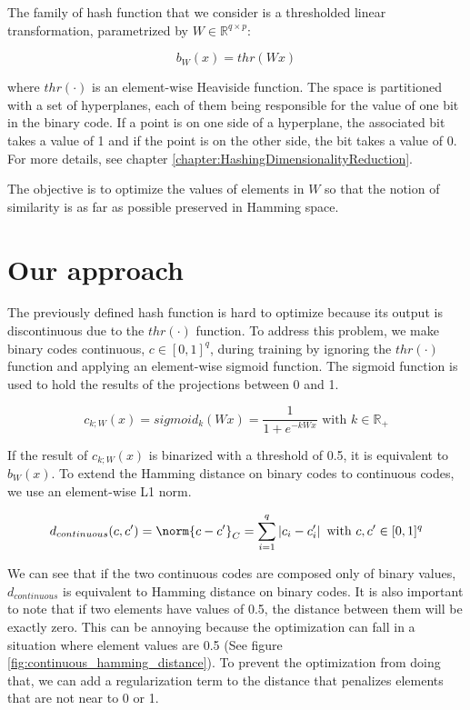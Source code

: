 The family of hash function that we consider is a thresholded linear transformation, parametrized by $W \in \mathbb{R}^{q \times p}$:

\[b_{W}(x) = thr(Wx)\]

where $thr(\cdot)$ is an element-wise Heaviside function. The space is partitioned with a set of hyperplanes, each of them being responsible for the value of one bit in the binary code. If a point is on one side of a hyperplane, the associated bit takes a value of 1 and if the point is on the other side, the bit takes a value of 0. For more details, see chapter \ref{chapter:HashingDimensionalityReduction}.

The objective is to optimize the values of elements in $W$ so that the notion of similarity is as far as possible preserved in Hamming space.

\section{Our approach}
The previously defined hash function is hard to optimize because its output is discontinuous due to the $thr(\cdot)$ function. To address this problem, we make binary codes continuous, $c \in [0, 1]^{q}$, during training by ignoring the $thr(\cdot)$ function and applying an element-wise sigmoid function. The sigmoid function is used to hold the results of the projections between 0 and 1.

\[c_{k;W}(x) = sigmoid_k(Wx) = \frac{1}{1 + e^{-kWx}} \text{ with } k \in \mathbb{R}_+\]

If the result of $c_{k;W}(x)$ is binarized with a threshold of 0.5, it is equivalent to $b_{W}(x)$. To extend the Hamming distance on binary codes to continuous codes, we use an element-wise L1 norm.

\[d_{continuous}(c, c') = \norm{c - c'}_{C} = \sum\limits_{i=1}^q \left|c_i-c'_i\right| \text{ with } c, c' \in [0, 1]^{q}\]

We can see that if the two continuous codes are composed only of binary values, $d_{continuous}$ is equivalent to Hamming distance on binary codes. It is also important to note that if two elements have values of 0.5, the distance between them will be exactly zero. This can be annoying because the optimization can fall in a situation where element values are 0.5 (See figure \ref{fig:continuous_hamming_distance}). To prevent the optimization from doing that, we can add a regularization term to the distance that penalizes elements that are not near to 0 or 1.

